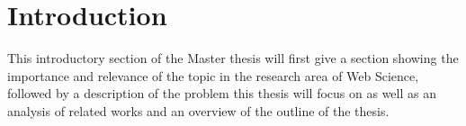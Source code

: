 
\chapter{Introduction} %
\label{cha:introduction}

This introductory section of the Master thesis will first give a section showing the importance and relevance of the topic in the research area of Web Science,
followed by a description of the problem this thesis will focus on as well as an analysis of related works and an overview of the outline of the thesis.









